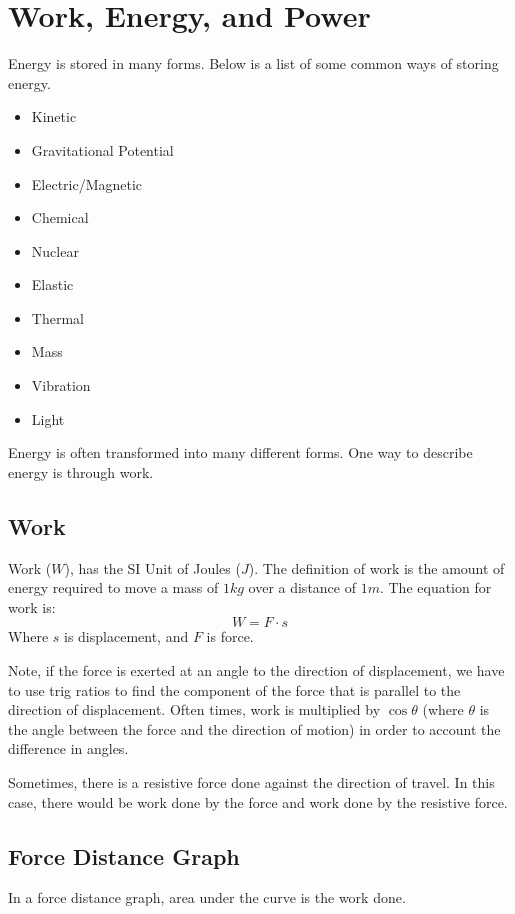 \documentclass[../notes.tex]{subfiles}
\begin{document}
\section{Work, Energy, and Power}
Energy is stored in many forms.
Below is a list of some common ways of storing energy.
\begin{itemize}
	\item Kinetic
	\item Gravitational Potential
	\item Electric/Magnetic
	\item Chemical
	\item Nuclear
	\item Elastic
	\item Thermal
	\item Mass
	\item Vibration
	\item Light
\end{itemize}

Energy is often transformed into many different forms.
One way to describe energy is through work.

\subsection{Work}
Work ($W$), has the SI Unit of Joules ($J$).
The definition of work is the amount of energy required to move a mass of $1 kg$ over a distance of $1m$.
The equation for work is:
 \begin{equation}
	W = F \cdot s
\end{equation}
Where $s$ is displacement, and $F$ is force. 

Note, if the force is exerted at an angle to the direction of displacement, we have to use trig ratios to find the component of the force that is parallel to the direction of displacement.
Often times, work is multiplied by $\cos\theta$ (where $\theta$ is the angle between the force and the direction of motion) in order to account the difference in angles.

Sometimes, there is a resistive force done against the direction of travel.
In this case, there would be work done by the force and work done by the resistive force.

\subsection{Force Distance Graph}
In a force distance graph, area under the curve is the work done.
\end{document}
